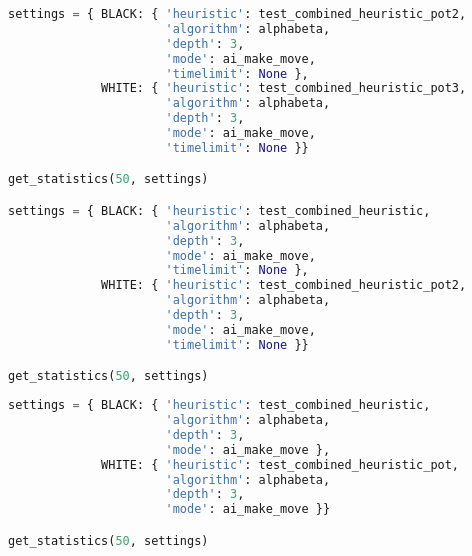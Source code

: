 \begin{lstlisting}[language=Python]
settings = { BLACK: { 'heuristic': test_combined_heuristic_pot2,
                      'algorithm': alphabeta,
                      'depth': 3,
                      'mode': ai_make_move,
                      'timelimit': None },
             WHITE: { 'heuristic': test_combined_heuristic_pot3,
                      'algorithm': alphabeta,
                      'depth': 3,
                      'mode': ai_make_move,
                      'timelimit': None }}

get_statistics(50, settings)

settings = { BLACK: { 'heuristic': test_combined_heuristic,
                      'algorithm': alphabeta,
                      'depth': 3,
                      'mode': ai_make_move,
                      'timelimit': None },
             WHITE: { 'heuristic': test_combined_heuristic_pot2,
                      'algorithm': alphabeta,
                      'depth': 3,
                      'mode': ai_make_move,
                      'timelimit': None }}

get_statistics(50, settings)
\end{lstlisting}

\begin{lstlisting}[language=Python]
settings = { BLACK: { 'heuristic': test_combined_heuristic,
                      'algorithm': alphabeta,
                      'depth': 3,
                      'mode': ai_make_move },
             WHITE: { 'heuristic': test_combined_heuristic_pot,
                      'algorithm': alphabeta,
                      'depth': 3,
                      'mode': ai_make_move }}

get_statistics(50, settings)
\end{lstlisting}

